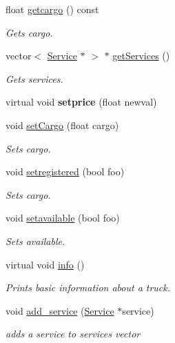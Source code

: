 \begin{DoxyCompactItemize}
float \hyperlink{class_truck_a3936315853876f84c85c4ffff194e1a5}{getcargo} () const
\begin{DoxyCompactList}\small\item\em Gets cargo. \end{DoxyCompactList}\item 
vector$<$ \hyperlink{class_service}{Service} $\ast$ $>$ $\ast$ \hyperlink{class_truck_a207506f38e78d7a5f065893295a2c00d}{get\+Services} ()
\begin{DoxyCompactList}\small\item\em Gets services. \end{DoxyCompactList}\item 
\mbox{\label{class_truck_a22d2dc22b1c5b9652d463ec624442403}} 
virtual void {\bfseries setprice} (float newval)
\item 
void \hyperlink{class_truck_ac26288a4d560deb5383fd07618fb13e6}{set\+Cargo} (float cargo)
\begin{DoxyCompactList}\small\item\em Sets cargo. \end{DoxyCompactList}\item 
void \hyperlink{class_truck_a9268e17e1a967d1702b28c6940403aa4}{setregistered} (bool foo)
\begin{DoxyCompactList}\small\item\em Sets cargo. \end{DoxyCompactList}\item 
void \hyperlink{class_truck_a59ca935a364da118131ed85647aa4f0d}{setavailable} (bool foo)
\begin{DoxyCompactList}\small\item\em Sets available. \end{DoxyCompactList}\item 
virtual void \hyperlink{class_truck_a38f09eab2822524e355ecf6d0a13f7de}{info} ()
\begin{DoxyCompactList}\small\item\em Prints basic information about a truck. \end{DoxyCompactList}\item 
void \hyperlink{class_truck_a03c8acd51c35f24db74cd8b2ee20cacb}{add\+\_\+service} (\hyperlink{class_service}{Service} $\ast$service)
\begin{DoxyCompactList}\small\item\em adds a service to services vector \end{DoxyCompactList}\item 

\end{DoxyCompactItemize}
